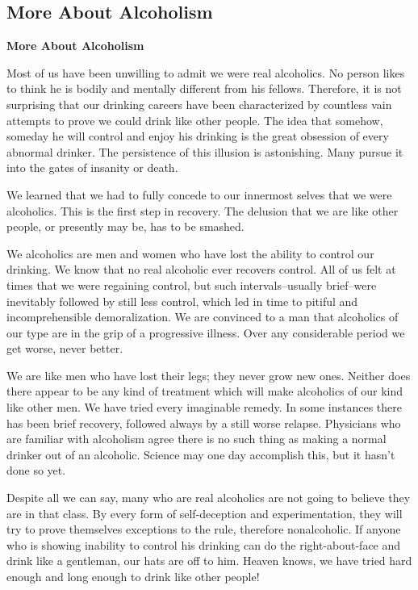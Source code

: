 \documentclass{beamer}
\begin{document}
\subsection{More About Alcoholism}
\begin{frame}%
\textcolor{example}{\textbf{More About Alcoholism}}
\bigskip
\bigskip

Most of us have been unwilling to admit we were real alcoholics. No person likes to think he  is  bodily  and  mentally  different  from  his  fellows. Therefore, it is not surprising that our drinking careers have  been  characterized  by  countless  vain  attempts to  prove  we  could  drink  like  other  people.  The  idea that  somehow,  someday  he  will  control  and  enjoy  his drinking  is  the  great  obsession  of  every  abnormal drinker.  The  persistence  of  this  illusion  is  astonishing. Many  pursue  it  into  the  gates  of  insanity  or  death. 
\bigskip

We  learned  that  we  had  to  fully  concede  to  our  innermost  selves  that  we  were  alcoholics.  This  is  the first  step  in  recovery.  The  delusion  that  we  are  like other people, or presently may be, has to be smashed. 
\bigskip

We  alcoholics  are  men  and  women  who  have  lost the  ability  to  control  our  drinking.  We  know  that  no real  alcoholic  ever recovers  control.  All  of  us  felt  at times  that  we  were  regaining  control,  but  such  intervals--usually  brief--were  inevitably  followed  by  still less control, which led in time to pitiful and incomprehensible  demoralization.  We  are  convinced  to  a  man that alcoholics of our type are in the grip of a progressive  illness.  Over  any  considerable  period  we  get worse,  never  better. 
\bigskip

We are like  men  who  have  lost  their  legs;  they never grow new ones. Neither does there appear to be any  kind  of  treatment  which  will  make  alcoholics  of our kind like other men. We have tried every imaginable  remedy.  In  some  instances  there  has  been  brief recovery,  followed  always by  a  still  worse  relapse. Physicians  who  are  familiar  with  alcoholism  agree there is no such thing as making a normal drinker out of  an  alcoholic.  Science  may  one  day  accomplish  this, but  it  hasn’t  done  so  yet. 
\bigskip

Despite all we can say, many who are real alcoholics are  not  going  to  believe  they  are  in  that  class.  By every form  of  self-deception  and  experimentation,  they will  try  to  prove  themselves  exceptions  to  the  rule, therefore  nonalcoholic.  If  anyone  who  is  showing inability  to  control  his  drinking  can  do  the  right-about-face  and  drink  like  a  gentleman,  our  hats  are off to him. Heaven knows, we have tried hard enough and  long  enough  to  drink  like  other  people! 
\bigskip


\end{frame}
\end{document}
